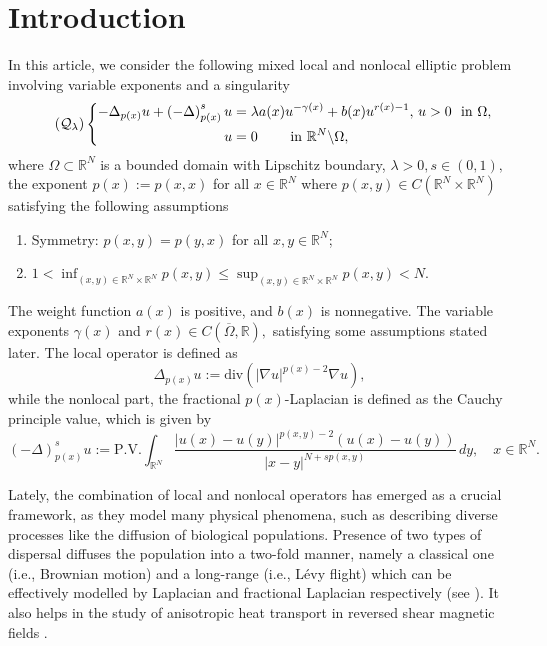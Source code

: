 \documentclass[11pt]{article}
\newcommand{\ga} {\gamma}
\newcommand{\om} {\Omega}
\newcommand{\De} {\Delta}
\newcommand{\la} {\lambda}
\newcommand{\na} {\nabla}
\newcommand{\oline} {\overline}
\newcommand{\real}{\mathbb{R}}
\newcommand{\rnn}{\mathbb{R}^{N}}
\newcommand{\lb}{\left(}
\newcommand{\rb}{\right)}
\begin{document}
\section{Introduction}
In this article, we consider the following mixed local 
and nonlocal elliptic problem involving 
variable exponents and a singularity
	\begin{equation}\label{eq1}\tag{$\mathcal{Q}_{\lambda}$}
   \left\{
	\begin{aligned}
		-\De_{p(x)}u+\lb -\De\rb^s_{p(x)}u 
&=\lambda a(x)u^{-\gamma(x)}+b(x)u^{r(x)-1},\,
u>0 \ \text{ in } \om,\\
u &= 0 \qquad \text{ in } \rnn\backslash\om,
	\end{aligned}
    \right.
\end{equation}
where
$\om \subset \rnn$
is a bounded domain with Lipschitz boundary,
$\la>0, s\in (0,1),$
the exponent $p(x):=p(x,x)$
for all $x\in\rnn$
where $p(x,y)\in C(\rnn\times\rnn)$
satisfying  the following assumptions
\begin{enumerate}
    
\item[$(P_1)$] Symmetry: $p(x,y)=p(y,x)$
for all $x,y\in \rnn$;
    
\item[$(P_2)$] $1<\inf_{(x,y)\in 
\rnn\times\rnn}p(x,y)\le \sup_{(x,y)\in 
\rnn\times\rnn}p(x,y)<N$.
\end{enumerate}
The weight function $a(x)$
is positive, and $b(x)$
is nonnegative. The variable exponents
$\ga(x)$
and
$r(x)\in C(\oline\om,\real),$
satisfying some assumptions stated later. 
The local operator is defined as 
$$
\De_{p(x)}u:=\text{div}(|\na u|^{p(x)-2}\na u),
$$
while the nonlocal part, the fractional
$p(x)$-Laplacian is defined as the Cauchy 
principle value, which is given by
$$
\lb-\De\rb^s_{p(x)}u:=\text{P.V.}
\int_{\mathbb{R}^{N}}
\frac{|u(x)-u(y)|^{p(x,y)-2}(u(x)-u(y))}
{|x-y|^{N+sp(x,y)}}\,dy,\quad x\in\rnn.
$$

 
 Lately, the combination of local and nonlocal operators 
 has emerged as a crucial framework, as they model 
 many physical phenomena, such as describing diverse 
 processes like the diffusion of biological populations.
 Presence of two types of dispersal diffuses the population 
 into a two-fold manner, namely a classical one 
 (i.e., Brownian motion) and a long-range 
 (i.e., L\'{e}vy flight) which can be effectively 
 modelled by Laplacian and fractional Laplacian 
 respectively (see
\cite{ valdinoci_logistic_equation, 
 valdinoci_ecological_niche}).
 It also helps in the study of anisotropic heat 
 transport in reversed shear magnetic fields 
 \cite{blazevski_anisotropic_heat_transport}.
\end{document}
